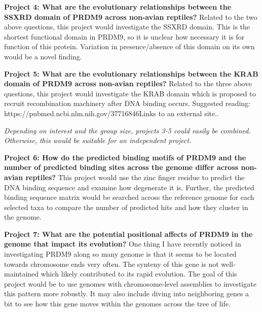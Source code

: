 \documentclass[
  letterpaper,
  DIV=11,
  numbers=noendperiod]{scrreprt}
\begin{document}
\textbf{Project 4: What are the evolutionary relationships between the
SSXRD domain of PRDM9 across non-avian reptiles?} Related to the two
above questions, this project would investigate the SSXRD domain. This
is the shortest functional domain in PRDM9, so it is unclear how
necessary it is for function of this protein. Variation in
presence/absence of this domain on its own would be a novel finding.

\textbf{Project 5: What are the evolutionary relationships between the
KRAB domain of PRDM9 across non-avian reptiles?} Related to the three
above questions, this project would investigate the KRAB domain which is
proposed to recruit recombination machinery after DNA binding occurs.
Suggested reading: https://pubmed.ncbi.nlm.nih.gov/37716846Links to an
external site..

\emph{Depending on interest and the group size, projects 3-5 could
easily be combined. Otherwise, this would be suitable for an independent
project.}

\textbf{Project 6: How do the predicted binding motifs of PRDM9 and the
number of predicted binding sites across the genome differ across
non-avian reptiles?} This project would use the zinc finger residue to
predict the DNA binding sequence and examine how degenerate it is.
Further, the predicted binding sequence matrix would be searched across
the reference genome for each selected taxa to compare the number of
predicted hits and how they cluster in the genome.

\textbf{Project 7: What are the potential positional affects of PRDM9 in
the genome that impact its evolution?} One thing I have recently noticed
in investigating PRDM9 along so many genome is that it seems to be
located towards chromosome ends very often. The synteny of this gene is
not well-maintained which likely contributed to its rapid evolution. The
goal of this project would be to use genomes with chromosome-level
assemblies to investigate this pattern more robustly. It may also
include diving into neighboring genes a bit to see how this gene moves
within the genomes across the tree of life.
\end{document}
